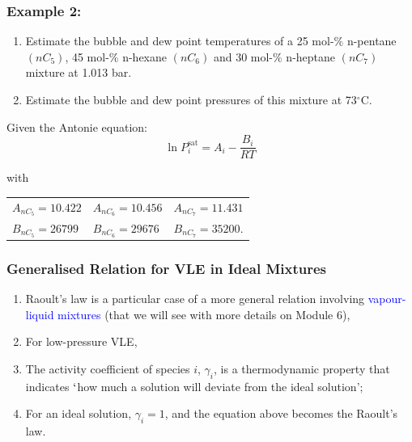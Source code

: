 \documentclass[10pt,compress]{beamer}
\newcommand{\frc}{\displaystyle\frac}
\begin{document}
\begin{frame} %
  \frametitle{Example 2:}
    \begin{enumerate}
        \item Estimate the bubble and dew point temperatures of a 25 mol-$\%$ n-pentane $\left(nC_{5}\right)$, 45 mol-$\%$ n-hexane $\left(nC_{6}\right)$ and 30 mol-$\%$ n-heptane $\left(nC_{7}\right)$ mixture at 1.013 bar. 
        \item  Estimate the bubble and dew point pressures of this mixture at 73$^{\circ}$C.
    \end{enumerate}
    Given the Antonie equation:
    \begin{displaymath}
       \ln P_{i}^{\text{sat}} = A_{i} - \frc{B_{i}}{RT}
    \end{displaymath}

    with
    \begin{center}
       \begin{tabular}{l l l} 
          $A_{nC_{5}}=10.422$ & $A_{nC_{6}}=10.456$ & $A_{nC_{7}}=11.431$ \\
          $B_{nC_{5}}=26799$  & $B_{nC_{6}}=29676$  & $B_{nC_{7}}=35200$.
       \end{tabular}
    \end{center}
\end{frame}
\normalsize

\begin{frame}
  \frametitle{Generalised Relation for VLE in Ideal Mixtures}
  \begin{enumerate}
      \item<1-> Raoult's law is a particular case of a more general relation involving \textcolor{blue}{vapour-liquid mixtures} (that we will see with more details on Module 6),
      \item<3-> For low-pressure VLE,
      \item<4-> The activity  coefficient of species $i$, $\gamma_{i}$, is a thermodynamic property that indicates $\lq$how much a solution will deviate from the ideal solution';
      \item<4-> For an ideal solution, $\gamma_{i}=1$, and the equation above becomes the Raoult's law.  
  \end{enumerate}
\end{frame}
\end{document}
